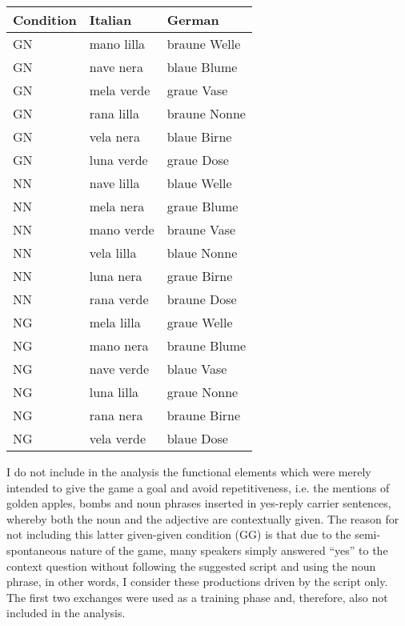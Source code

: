 \begin{flushleft}
\tablefirsthead{}
\tablehead{}
\tabletail{}
\tablelasttail{}
\begin{supertabular}{m{0.8740598in}m{0.8740598in}m{0.8740598in}}
\hline
Condition &
Italian &
German\\\hline
GN &
mano lilla &
braune Welle\\
GN &
nave nera &
blaue Blume\\
GN &
mela verde &
graue Vase\\
GN &
rana lilla &
braune Nonne\\
GN &
vela nera &
blaue Birne\\
GN &
luna verde &
graue Dose\\
NN &
nave lilla &
blaue Welle\\
NN &
mela nera &
graue Blume\\
NN &
mano verde &
braune Vase\\
NN &
vela lilla &
blaue Nonne\\
NN &
luna nera &
graue Birne\\
NN &
rana verde &
braune Dose\\
NG &
mela lilla &
graue Welle\\
NG &
mano nera &
braune Blume\\
NG &
nave verde &
blaue Vase\\
NG &
luna lilla &
graue Nonne\\
NG &
rana nera &
braune Birne\\
NG &
vela verde &
blaue Dose\\
\end{supertabular}
\end{flushleft}
\begin{styleStandard}
I do not include in the analysis the functional elements which were merely intended to give the game a goal and avoid repetitiveness, i.e. the mentions of golden apples, bombs and noun phrases inserted in yes-reply carrier sentences, whereby both the noun and the adjective are contextually given. The reason for not including this latter given-given condition (GG) is that due to the semi-spontaneous nature of the game, many speakers simply answered “yes” to the context question without following the suggested script and using the noun phrase, in other words, I consider these productions driven by the script only. The first two exchanges were used as a training phase and, therefore, also not included in the analysis.
\end{styleStandard}

